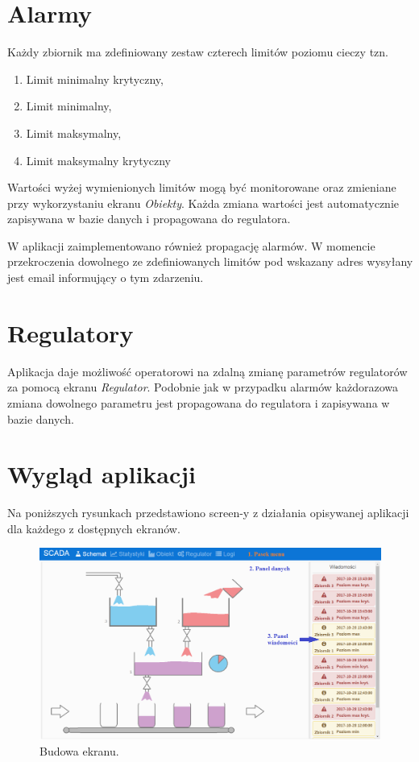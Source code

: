 \section{Alarmy}
Każdy zbiornik ma zdefiniowany zestaw czterech limitów poziomu cieczy tzn. 
\begin{enumerate}
	\item Limit minimalny krytyczny,
	\item Limit minimalny,
	\item Limit maksymalny,
	\item Limit maksymalny krytyczny
\end{enumerate}
Wartości wyżej wymienionych limitów mogą być monitorowane oraz zmieniane przy wykorzystaniu ekranu \textit{Obiekty}. Każda zmiana wartości jest automatycznie zapisywana w bazie danych i propagowana do regulatora.

W aplikacji zaimplementowano również propagację alarmów. W momencie przekroczenia dowolnego ze zdefiniowanych limitów pod wskazany adres wysyłany jest email informujący o tym zdarzeniu. 

\section{Regulatory}
Aplikacja daje możliwość operatorowi na zdalną zmianę parametrów regulatorów za pomocą ekranu \textit{Regulator}. Podobnie jak w przypadku alarmów każdorazowa zmiana dowolnego parametru jest propagowana do regulatora i zapisywana w bazie danych.
\section{Wygląd aplikacji}
Na poniższych rysunkach przedstawiono screen-y z działania opisywanej aplikacji dla każdego z dostępnych ekranów.
\begin{figure}[H]
	\centering
	\includegraphics[scale = 0.45]{fig/sc0.png}
	\caption{Budowa ekranu.}
	\label{fig:sc0}
\end{figure}


